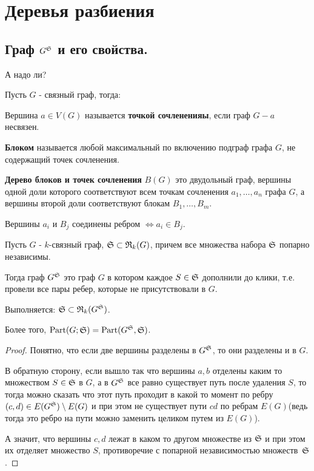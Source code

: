 \newpage

\section{Деревья разбиения}

\subsection{Граф $G^{\S}$ и его свойства.}

{\color{blue} А надо ли?

Пусть $G$ - связный граф, тогда:

\begin{df*}
	Вершина $a \in V(G)$ называется \textbf{точкой сочлененияы}, если граф  $G - a$ несвязен.
\end{df*}

\begin{df*}[Блок]
	\textbf{Блоком} называется любой максимальный по включению подграф графа $G$, не содержащий точек сочленения.
\end{df*}

\begin{df*}
	\textbf{Дерево блоков и точек сочленения} $B(G)$ это двудольный граф, вершины одной доли которого соответствуют всем точкам сочленения  $a_1, \ldots, a_n$ графа $G$, а вершины второй доли соответствуют блокам  $B_1, \ldots, B_m$.

	Вершины  $a_i$ и  $B_j$ соединены ребром  $\iff a_i \in B_j$.
\end{df*}
}

\begin{df*}[$G^{\S}$]
	Пусть $G$ - $k$-связный граф, $\S \subset \R_k(G)$, причем все множества набора $\S$ попарно независимы.

	Тогда граф $G^\S$ это граф $G$ в котором каждое $S \in \S$ дополнили до клики, т.е. провели все пары ребер, которые не присутствовали в $G$.
\end{df*}

\begin{customlm}{1.1} \label{lemma:1_1}
	Выполняется: $\S \subset \R_k(G^\S)$.

	Более того, $\Part(G; \S) = \Part(G^\S, \S)$.
\end{customlm}

\begin{proof}
	Понятно, что если две вершины разделены в $G^\S$, то они разделены и в $G$.

	В обратную сторону, если вышло так что вершины $a, b$ отделены каким то множеством $S \in \S$ в  $G$, а в  $G^\S$ все равно существует путь после удаления $S$, то тогда можно сказать что этот путь проходит в какой то момент по ребру  $(c,d) \in E(G^\S) \setminus E(G)$ и при этом не существует пути $cd$ по ребрам $E(G)$(ведь тогда это ребро на пути можно заменить целиком путем из $E(G)$).

	А значит, что вершины $c, d$ лежат в каком то другом множестве из  $\S$ и при этом их отделяет множество  $S$, противоречие с попарной независимостью множеств~$\S$.
\end{proof}


